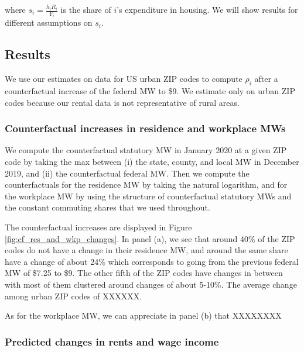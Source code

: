where $s_i = \frac{h_i R_i}{Y_i}$ is the share of $i$'s expenditure in housing. 
We will show results for different assumptions on $s_i$.

\subsection{Results}

We use our estimates on data for US urban ZIP codes to compute $\rho_i$ after a 
counterfactual increase of the federal MW to \$9. We estimate only on urban ZIP codes
because our rental data is not representative of rural areas.

\subsubsection{Counterfactual increases in residence and workplace MWs}\label{sec:cf_res_and_wkp_changes}

We compute the counterfactual statutory MW in January 2020 at a given ZIP code by taking 
the max between (i) the state, county, and local MW in December 2019, and (ii) the 
counterfactual federal MW. Then we compute the counterfactuals for the residence MW by 
taking the natural logarithm, and for the workplace MW by using the structure of 
counterfactual statutory MWs and the constant commuting shares that we used throughout.

The counterfactual increases are displayed in Figure \ref{fig:cf_res_and_wkp_changes}. 
In panel (a), we see that around 40\% of the ZIP codes do not have a change in their 
residence MW, and around the same share have a change of about 24\% which corresponds 
to going from the previous federal MW of \$7.25 to \$9. The other fifth of the ZIP 
codes have changes in between with most of them clustered around changes of about 
5-10\%. The average change among urban ZIP codes of XXXXXX.


As for the workplace MW, we can appreciate in panel (b) that XXXXXXXX


\subsubsection{Predicted changes in rents and wage income}\label{sec:cf_rents_and_wage_changes}

